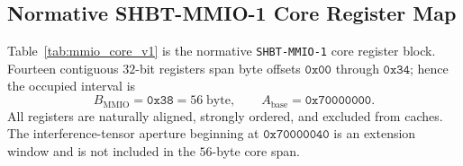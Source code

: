 \documentclass[10pt,twocolumn]{IEEEtran}
\begin{document}
\subsection{Normative SHBT-MMIO-1 Core Register Map}

Table~\ref{tab:mmio_core_v1} is the normative \texttt{SHBT-MMIO-1} core register block.  Fourteen contiguous $32$-bit registers span byte offsets $\mathtt{0x00}$ through $\mathtt{0x34}$; hence the occupied interval is
\begin{equation}
B_{\mathrm{MMIO}}=\mathtt{0x38}=56\;\mathrm{byte},
\qquad A_{\mathrm{base}}=\mathtt{0x70000000}.
\label{eq:mmio_core_span}
\end{equation}
All registers are naturally aligned, strongly ordered, and excluded from caches.  The interference-tensor aperture beginning at $\mathtt{0x70000040}$ is an extension window and is not included in the $56$-byte core span.
\end{document}
